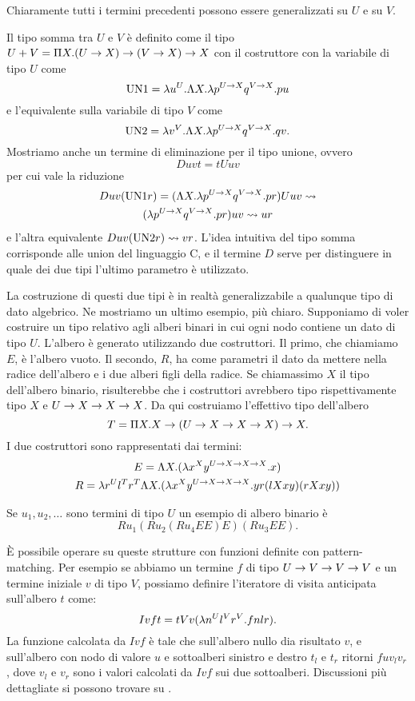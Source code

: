 \documentclass[]{marticle}
\begin{document}
Chiaramente tutti i termini precedenti possono essere generalizzati su $U$ e su
$V$.

Il tipo somma tra $U$ e $V$ \`e definito come il tipo $U+V = \Pi X. (U\rightarrow X)
\rightarrow (V\rightarrow X) \rightarrow X$ con il costruttore con la variabile di tipo $U$ come 
\[
    \text{UN1} = \lambda u^U. \Lambda X. \lambda p^{U\rightarrow X} q^{V\rightarrow X}. pu
\]
e l'equivalente sulla variabile di tipo $V$ come 
\[
    \text{UN2} = \lambda v^V. \Lambda X. \lambda p^{U\rightarrow X} q^{V\rightarrow X}. qv.
\]
Mostriamo anche un termine di eliminazione per il tipo unione, ovvero
\[
    D uvt = tU uv
\]
per cui vale la riduzione
\begin{gather*}
    Duv(\text{UN1}r) = (\Lambda X. \lambda p^{U\rightarrow X}q^{V\rightarrow X}. pr) U uv \rightsquigarrow \\
    (\lambda p^{U\rightarrow X}q^{V\rightarrow X}. pr)uv \rightsquigarrow u r
\end{gather*}
e l'altra equivalente $Duv(\text{UN2}r) \rightsquigarrow vr$.
L'idea intuitiva del tipo somma corrisponde alle union del linguaggio C, e il
termine $D$ serve per distinguere in quale dei due tipi l'ultimo parametro \`e
utilizzato.

La costruzione di questi due tipi \`e in realt\`a generalizzabile a qualunque
tipo di dato algebrico. Ne mostriamo un ultimo esempio, pi\`u chiaro. Supponiamo
di voler costruire un tipo relativo agli alberi binari in cui ogni nodo contiene
un dato di tipo $U$. L'albero \`e generato utilizzando due costruttori. Il
primo, che chiamiamo $E$, \`e l'albero vuoto. Il secondo, $R$, ha come parametri
il dato da mettere nella radice dell'albero e i due alberi figli della radice.
Se chiamassimo $X$ il tipo dell'albero binario, risulterebbe che i costruttori
avrebbero tipo rispettivamente tipo $X$ e $U \rightarrow X\rightarrow X \rightarrow X$. Da qui
costruiamo l'effettivo tipo dell'albero
\[
    T = \Pi X. X \rightarrow (U \rightarrow X \rightarrow X \rightarrow X) \rightarrow X.
\]
I due costruttori sono rappresentati dai termini:
\begin{gather*}
    E = \Lambda X. (\lambda x^X y^{U \rightarrow X \rightarrow X \rightarrow X}.x) \\
    R = \lambda r^U l^T r^T \Lambda X. (\lambda x^X y^{U \rightarrow X \rightarrow X \rightarrow X}.yr(lXxy)(rXxy))
\end{gather*}

Se $u_1, u_2,\dots$ sono termini di tipo $U$ un esempio di albero binario \`e 
\[
    Ru_1(Ru_2(Ru_4EE)E)(Ru_3EE).
\]

\`E possibile operare su queste strutture con funzioni definite con
pattern-matching. Per esempio se abbiamo un termine $f$ di tipo $U\rightarrow V \rightarrow V\rightarrow V$
e un termine iniziale $v$ di tipo $V$, possiamo definire l'iteratore di visita
anticipata sull'albero $t$ come:
\[
    Ivft = tVv(\lambda n^U l^V r^V. f nlr).
\]
La funzione calcolata da $Ivf$ \`e tale che sull'albero nullo dia risultato $v$,
e sull'albero con nodo di valore $u$ e sottoalberi sinistro e destro $t_l$ e
$t_r$ ritorni $f u v_l v_r$, dove $v_l$ e $v_r$ sono i valori calcolati da $Ivf$
sui due sottoalberi. Discussioni pi\`u dettagliate si possono trovare su
\cite{fortune}.
\end{document}
